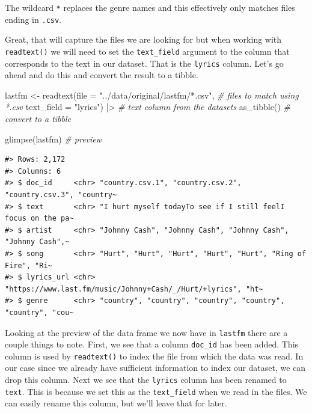 \documentclass[
  letterpaper,
]{latex/krantz}
\newenvironment{Shaded}{\begin{snugshade}}{\end{snugshade}}
\newcommand{\AttributeTok}[1]{\textcolor[rgb]{0.00,0.00,0.00}{#1}}
\newcommand{\CommentTok}[1]{\textcolor[rgb]{0.00,0.00,0.00}{\textit{#1}}}
\newcommand{\FunctionTok}[1]{\textcolor[rgb]{0.00,0.00,0.00}{#1}}
\newcommand{\NormalTok}[1]{\textcolor[rgb]{0.00,0.00,0.00}{#1}}
\newcommand{\OtherTok}[1]{\textcolor[rgb]{0.00,0.00,0.00}{#1}}
\newcommand{\SpecialCharTok}[1]{\textcolor[rgb]{0.00,0.00,0.00}{#1}}
\newcommand{\StringTok}[1]{\textcolor[rgb]{0.00,0.00,0.00}{#1}}
\begin{document}
The wildcard \texttt{*} replaces the genre names and this effectively
only matches files ending in \texttt{.csv}.

Great, that will capture the files we are looking for but when working
with \texttt{readtext()} we will need to set the \texttt{text\_field}
argument to the column that corresponds to the text in our dataset. That
is the \texttt{lyrics} column. Let's go ahead and do this and convert
the result to a tibble.

\begin{Shaded}
\begin{Highlighting}[]
\NormalTok{lastfm }\OtherTok{\textless{}{-}} 
  \FunctionTok{readtext}\NormalTok{(}\AttributeTok{file =} \StringTok{"../data/original/lastfm/*.csv"}\NormalTok{, }\CommentTok{\# files to match using *.csv}
           \AttributeTok{text\_field =} \StringTok{"lyrics"}\NormalTok{) }\SpecialCharTok{|\textgreater{}} \CommentTok{\# text column from the datasets}
  \FunctionTok{as\_tibble}\NormalTok{() }\CommentTok{\# convert to a tibble}

\FunctionTok{glimpse}\NormalTok{(lastfm) }\CommentTok{\# preview}
\end{Highlighting}
\end{Shaded}

\begin{verbatim}
#> Rows: 2,172
#> Columns: 6
#> $ doc_id     <chr> "country.csv.1", "country.csv.2", "country.csv.3", "country~
#> $ text       <chr> "I hurt myself todayTo see if I still feelI focus on the pa~
#> $ artist     <chr> "Johnny Cash", "Johnny Cash", "Johnny Cash", "Johnny Cash",~
#> $ song       <chr> "Hurt", "Hurt", "Hurt", "Hurt", "Hurt", "Ring of Fire", "Ri~
#> $ lyrics_url <chr> "https://www.last.fm/music/Johnny+Cash/_/Hurt/+lyrics", "ht~
#> $ genre      <chr> "country", "country", "country", "country", "country", "cou~
\end{verbatim}

Looking at the preview of the data frame we now have in \texttt{lastfm}
there are a couple things to note. First, we see that a column
\texttt{doc\_id} has been added. This column is used by
\texttt{readtext()} to index the file from which the data was read. In
our case since we already have sufficient information to index our
dataset, we can drop this column. Next we see that the \texttt{lyrics}
column has been renamed to \texttt{text}. This is because we set this as
the \texttt{text\_field} when we read in the files. We can easily rename
this column, but we'll leave that for later.
\end{document}
